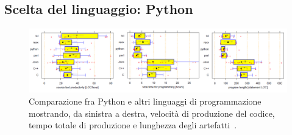\subsection{Scelta del linguaggio: Python}

\begin{figure}[h]
\centering
\includegraphics[viewport=0 0 1434 347, width=1\textwidth]{Immagini/Capitolo3/Python-comparison.pdf}
\caption[Comparazione fra Python e altri linguaggi di programmazione]{Comparazione fra Python e altri linguaggi di programmazione mostrando, da sinistra a destra, velocità di produzione del codice, tempo totale di produzione e lunghezza degli artefatti~\cite{prechelt2000}.}\label{fig:python-comparison}
\end{figure}

